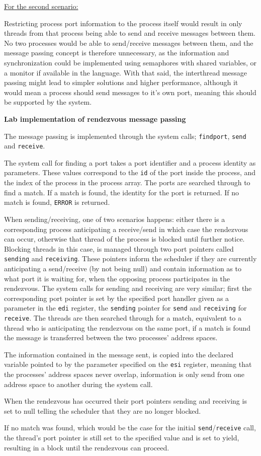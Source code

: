 \underline{For the second scenario:}

Restricting process port information to the process itself would result in only threads from that process being able to send and receive messages between them. No two processes would be able to send/receive messages between them, and the message passing concept is therefore unnecessary, as the information and synchronization could be implemented using semaphores with shared variables, or a monitor if available in the language. With that said, the interthread message passing might lead to simpler solutions and higher performance, although it would mean a process should send messages to it's own port, meaning this should be supported by the system.

\textbf{Lab implementation of rendezvous message passing}

The message passing is implemented through the system calls; \texttt{findport}, \texttt{send} and \texttt{receive}. 

The system call for finding a port takes a port identifier and a process identity as parameters. These values correspond to the \texttt{id} of the port inside the process, and the index of the process in the process array. The ports are searched through to find a match. If a match is found, the identity for the port is returned. If no match is found, \texttt{ERROR} is returned.

When sending/receiving, one of two scenarios happens: either there is a corresponding process anticipating a receive/send in which case the rendezvous can occur, otherwise that thread of the process is blocked until further notice. Blocking threads in this case, is managed through two port pointers called \texttt{sending} and \texttt{receiving}. These pointers inform the scheduler if they are currently anticipating a send/receive (by not being null) and contain information as to what port it is waiting for, when the opposing process participates in the rendezvous. The system calls for sending and receiving are very similar; first the corresponding port pointer is set by the specified port handler given as a parameter in the \texttt{edi} register, the \texttt{sending} pointer for \texttt{send} and \texttt{receiving} for \texttt{receive}. The threads are then searched through for a match, equivalent to a thread who is anticipating the rendezvous on the same port, if a match is found the message is transferred between the two processes' address spaces.

The information contained in the message sent, is copied into the declared variable pointed to by the parameter specified on the \texttt{esi} register, meaning that the processes' address spaces never overlap, information is only send from one address space to another during the system call.

When the rendezvous has occurred their port pointers sending and receiving is set to null telling the scheduler that they are no longer blocked.

If no match was found, which would be the case for the initial \texttt{send}/\texttt{receive} call, the thread's port pointer is still set to the specified value and is set to yield, resulting in a block until the rendezvous can proceed.
